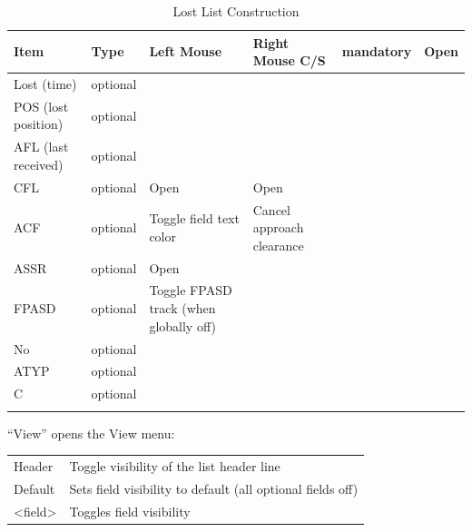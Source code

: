 \documentclass[a4paper,oneside,11pt]{memoir}
\begin{document}
\begin{longtable}{|p{}|p{}|p{}|p{}|} \hline
  \textbf{Item}           & \textbf{Type} & \textbf{Left Mouse}                     & \textbf{Right Mouse} \endhead \hline
  C/S                     & mandatory     & Open                    &                           \\ \hline
  Lost (time)             & optional      &                                         &                           \\ \hline
  POS (lost position)     & optional      &                                         &                           \\ \hline
  AFL (last received)     & optional      &                                         &                           \\ \hline
  CFL                     & optional      & Open                   & Open      \\ \hline
  ACF                     & optional      & Toggle field text color                 & Cancel approach clearance \\ \hline
  ASSR                    & optional      & Open                  &                           \\ \hline
  FPASD                   & optional      & Toggle FPASD track (when globally off)  &                           \\ \hline
  No                      & optional      &                                         &                           \\ \hline
  ATYP                    & optional      &                                         &                           \\ \hline
  C                       & optional      &                                         &                           \\ \hline
  \caption{Lost List Construction}
\end{longtable}

“View” opens the View menu:

\begin{longtable}{p{5cm} p{7.5cm}}
  Header      & Toggle visibility of the list header line                   \\
  Default     & Sets field visibility to default (all optional fields off)  \\
  <field>     & Toggles field visibility                                    \\
\end{longtable}
\end{document}
